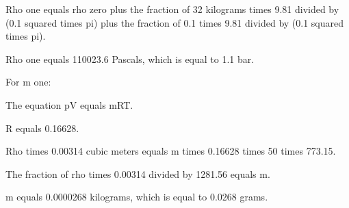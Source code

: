 Rho one equals rho zero plus the fraction of 32 kilograms times 9.81 divided by (0.1 squared times pi) plus the fraction of 0.1 times 9.81 divided by (0.1 squared times pi).

Rho one equals 110023.6 Pascals, which is equal to 1.1 bar.

For m one:

The equation pV equals mRT.

R equals 0.16628.

Rho times 0.00314 cubic meters equals m times 0.16628 times 50 times 773.15.

The fraction of rho times 0.00314 divided by 1281.56 equals m.

m equals 0.0000268 kilograms, which is equal to 0.0268 grams.